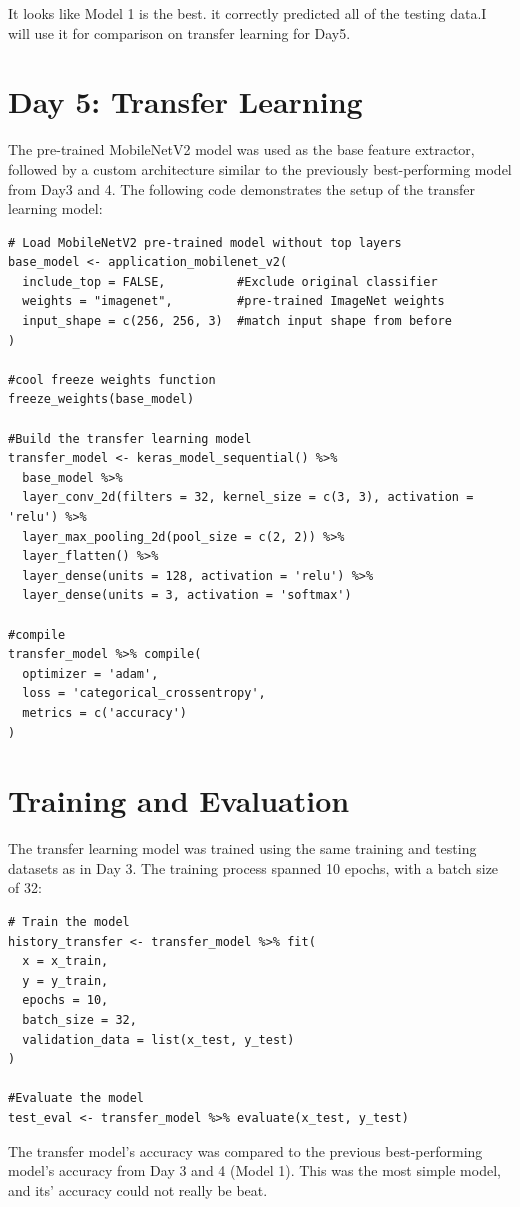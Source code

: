 \documentclass{article}
\begin{document}
It looks like Model 1 is the best. it correctly predicted all of the testing data.I will use it for comparison on transfer learning for Day5. 

\section{Day 5: Transfer Learning}
The pre-trained MobileNetV2 model was used as the base feature extractor, followed by a custom architecture similar to the previously best-performing model from Day3 and 4. The following code demonstrates the setup of the transfer learning model:

\begin{verbatim}
# Load MobileNetV2 pre-trained model without top layers
base_model <- application_mobilenet_v2(
  include_top = FALSE,          #Exclude original classifier
  weights = "imagenet",         #pre-trained ImageNet weights
  input_shape = c(256, 256, 3)  #match input shape from before
)

#cool freeze weights function
freeze_weights(base_model)

#Build the transfer learning model
transfer_model <- keras_model_sequential() %>%
  base_model %>%
  layer_conv_2d(filters = 32, kernel_size = c(3, 3), activation = 'relu') %>%
  layer_max_pooling_2d(pool_size = c(2, 2)) %>%
  layer_flatten() %>%
  layer_dense(units = 128, activation = 'relu') %>%
  layer_dense(units = 3, activation = 'softmax')

#compile
transfer_model %>% compile(
  optimizer = 'adam',
  loss = 'categorical_crossentropy',
  metrics = c('accuracy')
)
\end{verbatim}

\section{Training and Evaluation}
The transfer learning model was trained using the same training and testing datasets as in Day 3. The training process spanned 10 epochs, with a batch size of 32:

\begin{verbatim}
# Train the model
history_transfer <- transfer_model %>% fit(
  x = x_train,
  y = y_train,
  epochs = 10,
  batch_size = 32,
  validation_data = list(x_test, y_test)
)

#Evaluate the model
test_eval <- transfer_model %>% evaluate(x_test, y_test)
\end{verbatim}

The transfer model's accuracy was compared to the previous best-performing model's accuracy from Day 3 and 4 (Model 1). This was the most simple model, and its' accuracy could not really be beat. 
\end{document}
